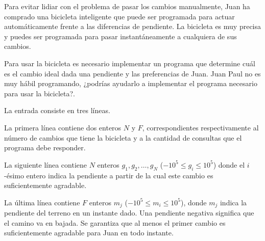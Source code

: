\documentclass{oci}
\begin{document}
\begin{problemDescription}
Para evitar lidiar con el problema de pasar los cambios manualmente, Juan ha
comprado una bicicleta inteligente que puede ser programada para actuar
automáticamente frente a las diferencias de pendiente.
La bicicleta es muy precisa y puedes ser programada para pasar instantáneamente
a cualquiera de sus cambios.

Para usar la bicicleta es necesario implementar un programa que determine cuál
es el cambio ideal dada una pendiente y las preferencias de Juan.
Juan Paul no es muy hábil programando, ¿podrías ayudarlo a implementar el
programa necesario para usar la bicicleta?.

\end{problemDescription}

\begin{inputDescription}
La entrada consiste en tres líneas.

La primera línea contiene dos enteros $N$ y $F$, correspondientes
respectivamente al número de cambios que tiene la bicicleta y a la cantidad
de consultas que el programa debe responder.

La siguiente línea contiene $N$ enteros $g_1,g_2,\ldots, g_N$ ($-10^5\leq
g_i\leq 10^5$) donde el $i$-ésimo entero indica la pendiente a partir de la cual
este cambio es suficientemente agradable.

La última línea contiene $F$ enteros $m_j$ ($-10^5\leq m_i\leq 10^5$), donde
$m_j$ indica la pendiente del terreno en un instante dado.
Una pendiente negativa significa que el camino va en bajada.
Se garantiza que al menos el primer cambio es suficientemente agradable para
Juan en todo instante.
\end{inputDescription}
\end{document}
